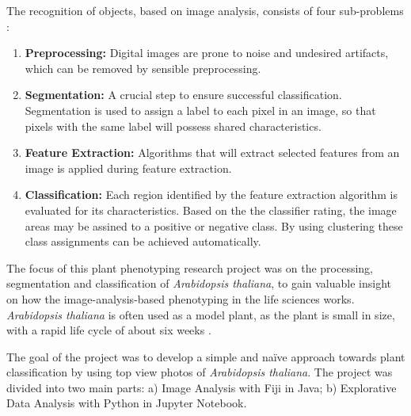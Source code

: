 \documentclass[paper=A4,bibliography=totocnumbered]{scrartcl}
\begin{document}
The recognition of objects, based on image analysis, consists of four sub-problems \citep{Adams.2018}: 
\begin{enumerate}
\item \textbf{Preprocessing:} Digital images are prone to noise and undesired artifacts, which can be removed by sensible preprocessing. 
\item \textbf{Segmentation:}  A crucial step to ensure successful classification. Segmentation is used to assign a label to each pixel in an image, so that pixels with the same label will possess shared characteristics. 
\item \textbf{Feature Extraction:}  Algorithms that will extract selected features from an image is applied during feature extraction. 
\item \textbf{Classification:}  Each region identified by the feature extraction algorithm is evaluated for its characteristics. Based on the the classifier rating, the image areas may be assined to  a positive or negative class. By using clustering these class assignments can be achieved automatically. 
\end{enumerate}

The focus of this plant phenotyping research project was on the processing, segmentation and classification of \textit{Arabidopsis thaliana}, to gain valuable insight on how the image-analysis-based phenotyping in the life sciences works. \textit{Arabidopsis thaliana} is often used as a model plant, as the plant is small in size, with a rapid life cycle of about six weeks \citep{Koornneef.2010}. 

The goal of the project was to develop a simple and naïve approach towards plant classification by using top view photos of \textit{Arabidopsis thaliana}. The project was divided into two main parts: a) Image Analysis with Fiji in Java; b) Explorative Data Analysis with Python in Jupyter Notebook.
\end{document}
